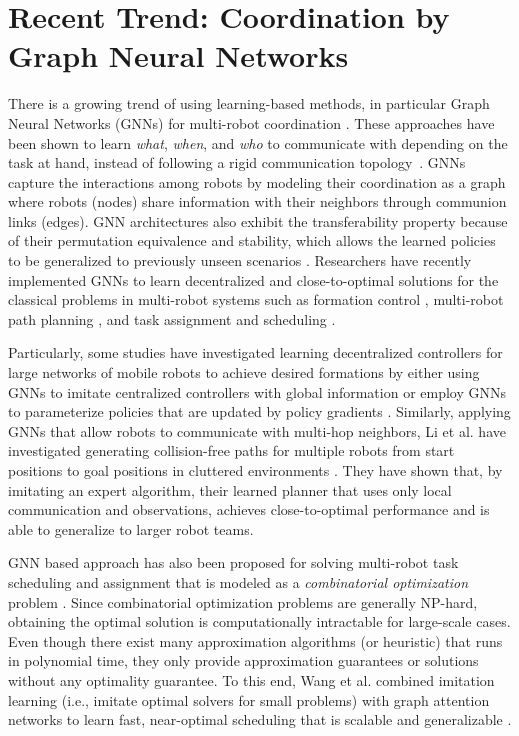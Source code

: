 \section{Recent Trend: Coordination by Graph Neural Networks} \label{sec:coord_gnn}
There is a growing trend of using learning-based methods, in particular Graph Neural Networks (GNNs) for multi-robot coordination \cite{prorok2018graph,gama2020graph}. These approaches have been shown to learn \emph{what}, \emph{when}, and \emph{who} to communicate with depending on the task at hand, instead of following a rigid communication topology~\cite{liu2020when2com,liu2020who2com}. GNNs  capture the interactions among robots by modeling their coordination as a graph where robots (nodes) share information with their neighbors through communion links (edges). GNN architectures also exhibit the transferability property because of their permutation equivalence and stability, which allows the learned policies to be generalized to previously unseen scenarios \cite{ruiz2020graph,gama2019stability}. Researchers have recently implemented GNNs to learn decentralized and close-to-optimal solutions for the classical problems in multi-robot systems such as formation control \cite{prorok2018graph,tolstaya2020learning,khan2020graph,khan2019graph}, multi-robot path planning \cite{li2019graph}, and task assignment and scheduling \cite{wang2020learning}. 

Particularly, some studies have investigated learning decentralized controllers for large networks of mobile robots to achieve desired formations by either using GNNs to imitate centralized controllers with global information \cite{tolstaya2020learning} or employ GNNs to parameterize policies that are updated by policy gradients \cite{sutton2018reinforcement}. Similarly, applying GNNs that allow robots to communicate with multi-hop neighbors, Li et al. have investigated generating collision-free paths for multiple robots from start positions to goal positions in cluttered environments \cite{li2019graph}. They have shown that, by imitating an expert algorithm, their learned planner that uses only local communication and observations, achieves close-to-optimal performance and is able to generalize to larger robot teams. 

GNN based approach has also been proposed for solving multi-robot task scheduling and assignment that is modeled as a \textit{combinatorial optimization} problem \cite{wang2020learning}. Since combinatorial optimization problems are generally NP-hard, obtaining the optimal solution is computationally intractable for large-scale cases. Even though there exist many approximation algorithms (or heuristic) that runs in polynomial time, they only provide approximation guarantees or solutions without any optimality guarantee. To this end, Wang et al. combined imitation learning (i.e., imitate optimal solvers for small problems) with graph attention networks to learn fast, near-optimal scheduling that is scalable and generalizable \cite{wang2020learning}. 

